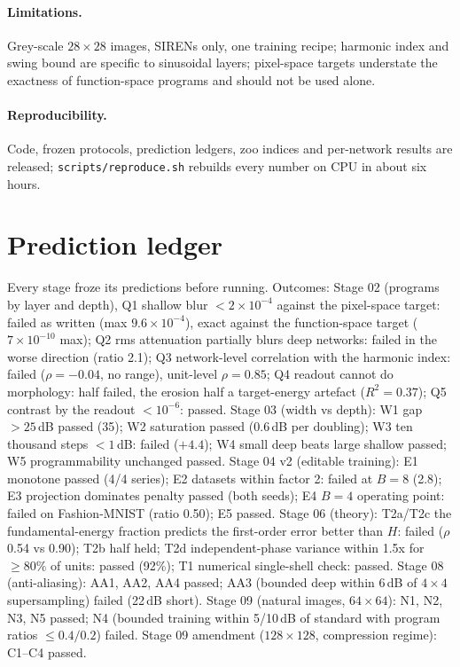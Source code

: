\documentclass[11pt]{article}
\begin{document}
\paragraph{Limitations.} Grey-scale $28\times28$ images, SIRENs only, one training recipe; harmonic index and swing bound are specific to sinusoidal layers; pixel-space targets understate the exactness of function-space programs and should not be used alone.

\paragraph{Reproducibility.} Code, frozen protocols, prediction ledgers, zoo indices and per-network results are released; \texttt{scripts/reproduce.sh} rebuilds every number on CPU in about six hours.




\appendix
\section{Prediction ledger}
\label{app:ledger}
Every stage froze its predictions before running. Outcomes: Stage 02 (programs by layer and depth), Q1 shallow blur $<2\times10^{-4}$ against the pixel-space target: failed as written (max $9.6\times10^{-4}$), exact against the function-space target ($7\times10^{-10}$ max); Q2 rms attenuation partially blurs deep networks: failed in the worse direction (ratio 2.1); Q3 network-level correlation with the harmonic index: failed ($\rho=-0.04$, no range), unit-level $\rho=0.85$; Q4 readout cannot do morphology: half failed, the erosion half a target-energy artefact ($R^2=0.37$); Q5 contrast by the readout $<10^{-6}$: passed. Stage 03 (width vs depth): W1 gap $>25$\,dB passed (35); W2 saturation passed (0.6\,dB per doubling); W3 ten thousand steps $<1$\,dB: failed ($+4.4$); W4 small deep beats large shallow passed; W5 programmability unchanged passed. Stage 04 v2 (editable training): E1 monotone passed (4/4 series); E2 datasets within factor 2: failed at $B=8$ (2.8); E3 projection dominates penalty passed (both seeds); E4 $B=4$ operating point: failed on Fashion-MNIST (ratio 0.50); E5 passed. Stage 06 (theory): T2a/T2c the fundamental-energy fraction predicts the first-order error better than $H$: failed ($\rho$ 0.54 vs 0.90); T2b half held; T2d independent-phase variance within 1.5x for $\ge80\%$ of units: passed (92\%); T1 numerical single-shell check: passed. Stage 08 (anti-aliasing): AA1, AA2, AA4 passed; AA3 (bounded deep within 6\,dB of $4\times4$ supersampling) failed (22\,dB short). Stage 09 (natural images, $64\times64$): N1, N2, N3, N5 passed; N4 (bounded training within 5/10\,dB of standard with program ratios $\le0.4/0.2$) failed. Stage 09 amendment ($128\times128$, compression regime): C1--C4 passed.
\end{document}
